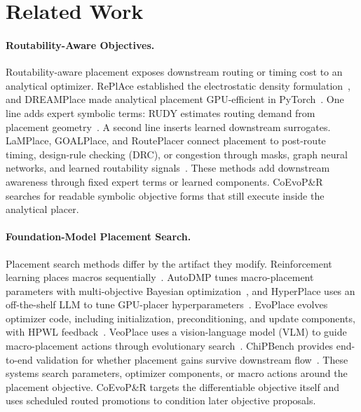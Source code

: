 \section{Related Work}

\paragraph{Routability-Aware Objectives.}
Routability-aware placement exposes downstream routing or timing cost to an
analytical optimizer. RePlAce established the electrostatic density
formulation~\cite{replace}, and DREAMPlace made analytical placement
GPU-efficient in PyTorch~\cite{dreamplace}. One line adds expert symbolic
terms: RUDY estimates routing demand from placement
geometry~\cite{rudy}. A second line inserts learned downstream surrogates.
LaMPlace, GOALPlace, and RoutePlacer connect placement to post-route timing,
design-rule checking (DRC), or congestion through masks, graph neural
networks, and learned routability signals~\cite{lamplace,goalplace,routeplacer}.
These methods add downstream awareness through fixed expert terms or learned
components. CoEvoP\&R searches for readable symbolic objective forms that
still execute inside the analytical placer.

\paragraph{Foundation-Model Placement Search.}
Placement search methods differ by the artifact they modify. Reinforcement
learning places macros sequentially~\cite{mirhoseini2021}. AutoDMP tunes
macro-placement parameters with multi-objective Bayesian
optimization~\cite{autodmp}, and HyperPlace uses an off-the-shelf LLM to tune
GPU-placer hyperparameters~\cite{hyperplace}. EvoPlace evolves optimizer
code, including initialization, preconditioning, and update components, with
HPWL feedback~\cite{evoplace}. VeoPlace uses a vision-language model (VLM) to
guide macro-placement actions through evolutionary search~\cite{veoplace}.
ChiPBench provides end-to-end validation for whether
placement gains survive downstream flow~\cite{chipbench}. These systems
search parameters, optimizer components, or macro actions around the placement
objective. CoEvoP\&R targets the differentiable objective itself and uses
scheduled routed promotions to condition later objective proposals.

